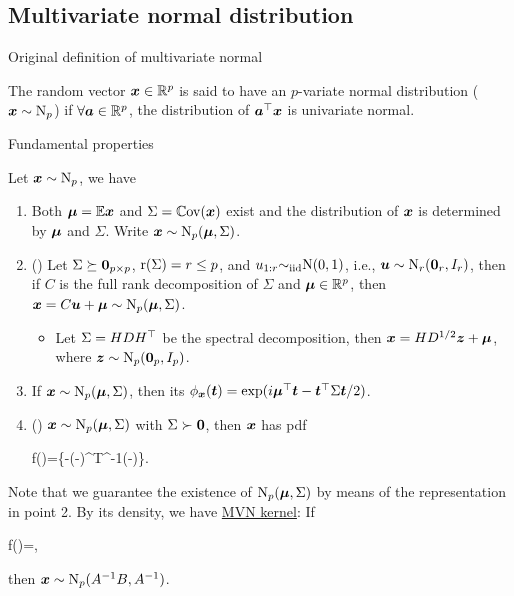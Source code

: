 \documentclass[10pt,a4paper]{book}
\begin{document}
\subsection{Multivariate normal distribution}\label{sec:mult_normal}
\begin{defbox}{Original definition of multivariate normal}
	\begin{definition}\label{def:oridef_multi_normal}
		The random vector ${\boldsymbol x}\in\mathbb R^p$ is said to have an $p$-variate normal distribution (${\boldsymbol x}\sim\mathrm{N}_p$) if $\forall {\boldsymbol a}\in\mathbb R^p$, the distribution of ${\boldsymbol a}^\top{\boldsymbol x}$ is univariate normal.  
	\end{definition}
\end{defbox}
\begin{thmbox}{Fundamental properties}
	\begin{theorem}\label{thm:multi_normal}
		Let ${\boldsymbol x}\sim\mathrm{N}_p$, we have
		\begin{enumerate}
			\item Both ${\boldsymbol\mu}=\mathbb E{\boldsymbol x}$ and $\Sigma=\mathbb{C}\mathrm{ov}({\boldsymbol x})$ exist and the distribution of ${\boldsymbol x}$ is determined by ${\boldsymbol\mu}$ and $\Sigma$. Write ${\boldsymbol x}\sim\mathrm{N}_p({\boldsymbol\mu},\Sigma)$. 
			\item () Let $\Sigma\succeq{\boldsymbol 0}_{p\times p}$, $\mathrm{r}(\Sigma)=r\leq p$, and $u_{1:r}{\sim}_{\mathrm{iid}}\mathrm{N}(0,1)$, i.e., ${\boldsymbol u}\sim\mathrm{N}_r({\boldsymbol 0}_r,I_r)$, then if $C$ is the full rank decomposition of $\Sigma$ and ${\boldsymbol\mu}\in\mathbb R^p$, then ${\boldsymbol x}=C{\boldsymbol u}+{\boldsymbol\mu}\sim\mathrm{N}_p({\boldsymbol\mu},\Sigma)$.  
			\begin{itemize}
				\item Let $\Sigma=HDH^\top$ be the spectral
				decomposition, then ${\boldsymbol x}=HD^{1/2}{\boldsymbol z}+{\boldsymbol\mu}$, where ${\boldsymbol z}\sim\mathrm{N}_p({\boldsymbol 0}_p,I_p)$.
			\end{itemize}
			\item If ${\boldsymbol x}\sim\mathrm{N}_p({\boldsymbol\mu},\Sigma)$, then its  $\phi_{\boldsymbol x}({\boldsymbol t})=\exp(i{\boldsymbol\mu}^\top{\boldsymbol t}-{\boldsymbol t}^\top\Sigma{\boldsymbol t}/2)$.
			\item () ${\boldsymbol x}\sim\mathrm{N}_p({\boldsymbol\mu},\Sigma)$ with $\Sigma\succ {\boldsymbol 0}$, then ${\boldsymbol x}$ has pdf
			\begin{sequation}\label{eq:mult_normal_density}
				f()=\exp\left\{-(-\boldsymbol{\mu})^{T}{\Sigma}^{-1}(-\boldsymbol{\mu})\right\}.
			\end{sequation}
		\end{enumerate}
	\end{theorem}
\end{thmbox}
Note that we guarantee the existence of $\mathrm{N}_p({\boldsymbol\mu},\Sigma)$ by means of the representation in point 2. By its density, we have \underline{MVN kernel}: If
\begin{sequation*}
	f(\x)\propto \exp{}=\exp{},
\end{sequation*}
then ${\boldsymbol x}\sim\mathrm{N}_p(A^{-1}B,A^{-1})$.
\end{document}
